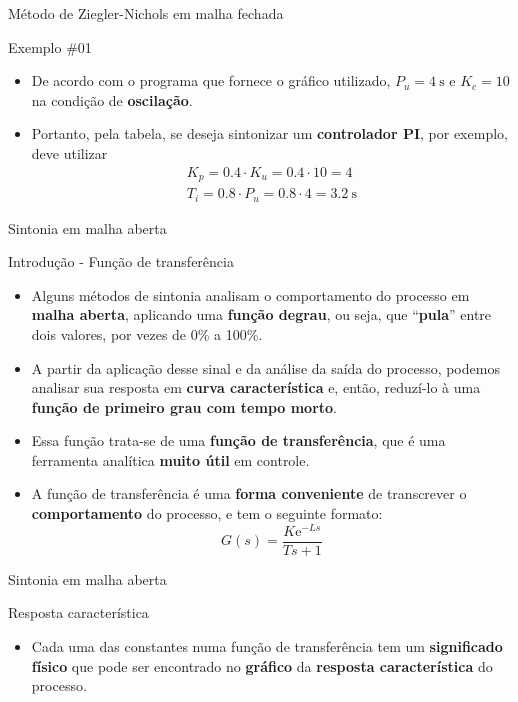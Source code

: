 \begin{frame}{Método de Ziegler-Nichols em malha fechada}
	\begin{block}{Exemplo \#01}
		\begin{itemize}
			\item De acordo com o programa que fornece o gráfico utilizado, $ P_u=\SI{4}{\second} $ e $ K_c=10 $ na condição de \textbf{oscilação}.
			\item Portanto, pela tabela, se deseja sintonizar um \textbf{controlador PI}, por exemplo, deve utilizar
			\begin{gather*}
			K_p=\num{0.4}\cdot K_u=\num{0.4}\cdot10=4\\
			T_i=\num{0.8}\cdot P_u=\num{0.8}\cdot4=\SI{3.2}{\second}
			\end{gather*}
		\end{itemize}
	\end{block}
\end{frame}


\begin{frame}{Sintonia em malha aberta}
	\begin{block}{Introdução - Função de transferência}
		\begin{itemize}
			\item Alguns métodos de sintonia analisam o comportamento do processo em \textbf{malha aberta}, aplicando uma \textbf{função degrau}, ou seja, que ``\textbf{pula}'' entre dois valores, por vezes de 0\% a 100\%.
			\item A partir da aplicação desse sinal e da análise da saída do processo, podemos analisar sua resposta em \textbf{curva característica} e, então, reduzí-lo à uma \textbf{função de primeiro grau com tempo morto}.
			\item Essa função trata-se de uma \textbf{função de transferência}, que é uma ferramenta analítica \textbf{muito útil} em controle.
			\item A função de transferência é uma \textbf{forma conveniente} de transcrever o \textbf{comportamento} do processo, e tem o seguinte formato:
			\[ G(s)=\dfrac{K\text{e}^{-Ls}}{Ts+1} \]
		\end{itemize}
	\end{block}
\end{frame}


\begin{frame}{Sintonia em malha aberta}
	\begin{block}{Resposta característica}
		\begin{itemize}
			\item Cada uma das constantes numa função de transferência tem um \textbf{significado físico} que pode ser encontrado no \textbf{gráfico} da \textbf{resposta característica} do processo.
		\end{itemize}
	\end{block}

	\centering
	\scalebox{1.2}{}
	
\end{frame}


